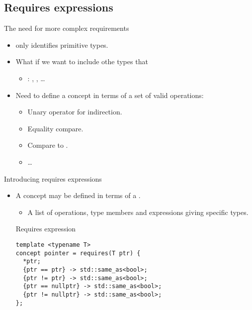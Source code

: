 \subsection{Requires expressions}

\begin{frame}[t,fragile]{The need for more complex requirements}
\begin{itemize}
  \item {} only identifies primitive types.

  \item What if we want to include othe types that 
    \begin{itemize}
      \item {}: , , \ldots
    \end{itemize}

  \item Need to define a concept in terms of a set of valid operations:
    \begin{itemize}
      \item Unary operator \cppkey{*} for indirection.
      \item Equality compare.
      \item Compare to .
      \item \ldots
    \end{itemize}
\end{itemize}
\end{frame}


\begin{frame}[t,fragile]{Introducing requires expressions}
\begin{itemize}
  \item A concept may be defined in terms of a .
    \begin{itemize}
      \item A list of operations, type members and expressions giving specific types.
    \end{itemize}

\begin{block}{Requires expression}
\begin{lstlisting}
template <typename T>
concept pointer = requires(T ptr) {
  *ptr;
  {ptr == ptr} -> std::same_as<bool>;
  {ptr != ptr} -> std::same_as<bool>;
  {ptr == nullptr} -> std::same_as<bool>;
  {ptr != nullptr} -> std::same_as<bool>;
};
\end{lstlisting}
\end{block}

\end{itemize}
\end{frame}


